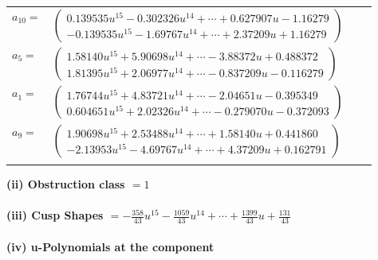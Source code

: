 \documentclass[1p]{elsarticle_modified}
\theoremstyle{definition}
\begin{document}
\begin{tabular}{m{7pt} m{180pt} m{7pt} m{180pt} }
\flushright $a_{10}=$&$\begin{pmatrix}0.139535 u^{15}-0.302326 u^{14}+\cdots+0.627907 u-1.16279\\-0.139535 u^{15}-1.69767 u^{14}+\cdots+2.37209 u+1.16279\end{pmatrix}$ \\
\flushright $a_{5}=$&$\begin{pmatrix}1.58140 u^{15}+5.90698 u^{14}+\cdots-3.88372 u+0.488372\\1.81395 u^{15}+2.06977 u^{14}+\cdots-0.837209 u-0.116279\end{pmatrix}$ \\
\flushright $a_{1}=$&$\begin{pmatrix}1.76744 u^{15}+4.83721 u^{14}+\cdots-2.04651 u-0.395349\\0.604651 u^{15}+2.02326 u^{14}+\cdots-0.279070 u-0.372093\end{pmatrix}$ \\
\flushright $a_{9}=$&$\begin{pmatrix}1.90698 u^{15}+2.53488 u^{14}+\cdots+1.58140 u+0.441860\\-2.13953 u^{15}-4.69767 u^{14}+\cdots+4.37209 u+0.162791\end{pmatrix}$\\&\end{tabular}
\flushleft \textbf{(ii) Obstruction class $= 1$}\\~\\
\flushleft \textbf{(iii) Cusp Shapes $= -\frac{358}{43} u^{15}-\frac{1059}{43} u^{14}+\cdots+\frac{1399}{43} u+\frac{131}{43}$}\\~\\
\newpage\renewcommand{\arraystretch}{1}
\flushleft \textbf{(iv) u-Polynomials at the component}\newline \\
\end{document}
